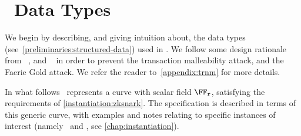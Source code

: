 
\section{\zeth~Data Types}\label{zeth-protocol:zeth-data-types}

We begin by describing, and giving intuition about, the data types (see~\cref{preliminaries:structured-data}) used in \zeth.
We follow some design rationale from \zerocash~\cite{sasson2014zerocash}, and \zcash~\cite{zcashprotocol} in order to prevent the transaction malleability attack, and the Faerie Gold attack\cite[Section 8.4]{zcashprotocol}. We refer the reader to~\cref{appendix:trnm} for more details.

In what follows \Curve~represents a curve with scalar field $\FFx{\rCURVE}$, satisfying the requirements of \cref{instantiation:zksnark}. The specification is described in terms of this generic curve, with examples and notes relating to specific instances of interest (namely \BNCurve~and \BLSCurve, see \cref{chap:instantiation}).

